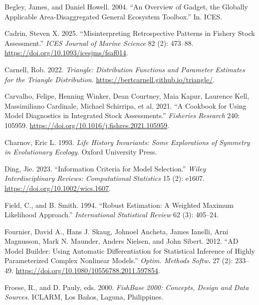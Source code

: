 \documentclass[
]{book}
\newlength{\cslhangindent}
\newlength{\cslentryspacingunit} %
\newenvironment{CSLReferences}[2] %
 {%
  \setlength{\parindent}{0pt}
  \ifodd #1
  \let\oldpar\par
  \def\par{\hangindent=\cslhangindent\oldpar}
  \fi
  \setlength{\parskip}{#2\cslentryspacingunit}
 }%
 {}
\begin{document}
\hypertarget{refs}{}
\begin{CSLReferences}{1}{0}
\leavevmode{}%
Begley, James, and Daniel Howell. 2004. {``An Overview of Gadget, the Globally Applicable Area-Disaggregated General Ecosystem Toolbox.''} In. ICES.

\leavevmode{}%
Cadrin, Steven X. 2025. {``Misinterpreting Retrospective Patterns in Fishery Stock Assessment.''} \emph{ICES Journal of Marine Science} 82 (2): 473--88. \url{https://doi.org/10.1093/icesjms/fsaf014}.

\leavevmode{}%
Carnell, Rob. 2022. \emph{Triangle: Distribution Functions and Parameter Estimates for the Triangle Distribution}. \url{https://bertcarnell.github.io/triangle/}.

\leavevmode{}%
Carvalho, Felipe, Henning Winker, Dean Courtney, Maia Kapur, Laurence Kell, Massimiliano Cardinale, Michael Schirripa, et al. 2021. {``A Cookbook for Using Model Diagnostics in Integrated Stock Assessments.''} \emph{Fisheries Research} 240: 105959. \url{https://doi.org/10.1016/j.fishres.2021.105959}.

\leavevmode{}%
Charnov, Eric L. 1993. \emph{Life History Invariants: Some Explorations of Symmetry in Evolutionary Ecology}. Oxford University Press.

\leavevmode{}%
Ding, Jie. 2023. {``Information Criteria for Model Selection.''} \emph{Wiley Interdisciplinary Reviews: Computational Statistics} 15 (2): e1607. \url{https://doi.org/10.1002/wics.1607}.

\leavevmode{}%
Field, C., and B. Smith. 1994. {``Robust Estimation: A Weighted Maximum Likelihood Approach.''} \emph{International Statistical Review} 62 (3): 405--24.

\leavevmode{}%
Fournier, David A., Hans J. Skaug, Johnoel Ancheta, James Ianelli, Arni Magnusson, Mark N. Maunder, Anders Nielsen, and John Sibert. 2012. {``A{D} Model Builder: Using Automatic Differentiation for Statistical Inference of Highly Parameterized Complex Nonlinear Models.''} \emph{Optim. Methods Softw.} 27 (2): 233--49. \url{https://doi.org/10.1080/10556788.2011.597854}.

\leavevmode{}%
Froese, R., and D. Pauly, eds. 2000. \emph{FishBase 2000: Concepts, Design and Data Sources.} ICLARM, Los Baños, Laguna, Philippines.


\end{CSLReferences}
\end{document}
